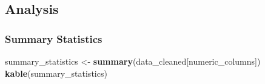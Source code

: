 \documentclass[
]{article}
\newenvironment{Shaded}{\begin{snugshade}}{\end{snugshade}}
\newcommand{\FunctionTok}[1]{\textcolor[rgb]{0.13,0.29,0.53}{\textbf{#1}}}
\newcommand{\NormalTok}[1]{#1}
\newcommand{\OtherTok}[1]{\textcolor[rgb]{0.56,0.35,0.01}{#1}}
\newcommand{\SpecialCharTok}[1]{\textcolor[rgb]{0.81,0.36,0.00}{\textbf{#1}}}
\begin{document}
\begin{Shaded}
\end{Shaded}

\hypertarget{analysis}{%
\subsection{Analysis}\label{analysis}}

\hypertarget{summary-statistics}{%
\subsubsection{Summary Statistics}\label{summary-statistics}}

\begin{Shaded}
\begin{Highlighting}[]
\NormalTok{summary\_statistics }\OtherTok{\textless{}{-}} \FunctionTok{summary}\NormalTok{(data\_cleaned[numeric\_columns])}
\FunctionTok{kable}\NormalTok{(summary\_statistics)}
\end{Highlighting}
\end{Shaded}
\end{document}
